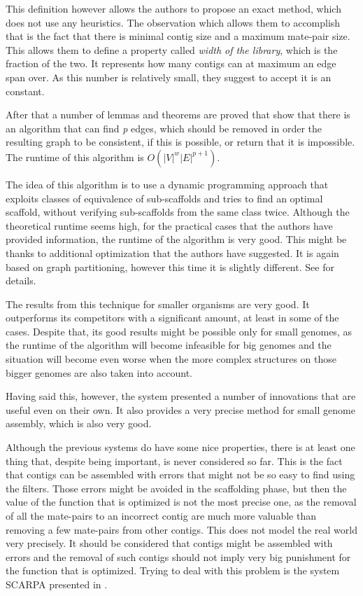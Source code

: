 \documentclass[11pt]{article}
\begin{document}
This definition however allows the authors to propose an exact method, which
does not use any heuristics. The observation which allows them to accomplish
that is the fact that there is minimal contig size and a maximum mate-pair size.
This allows them to define a property called \emph{width of the library}, which
is the fraction of the two. It represents how many contigs can at maximum an
edge span over. As this number is relatively small, they suggest to accept it is
an constant. 

After that a number of lemmas and theorems are proved that show that there is an
algorithm that can find \emph{p} edges, which should be removed in order the
resulting graph to be consistent, if this is possible, or return that it is
impossible. The runtime of this algorithm is $O(|V|^w |E|^{p + 1})$. 

The idea of this algorithm is to use a dynamic programming approach that
exploits classes of equivalence of sub-scaffolds and tries to find an optimal
scaffold, without verifying sub-scaffolds from the same class twice. Although
the theoretical runtime seems high, for the practical cases that the authors
have provided information, the runtime of the algorithm is very good. This might
be thanks to additional optimization that the authors have suggested. It is
again based on graph partitioning, however this time it is slightly different.
See \cite{Opera} for details.

The results from this technique for smaller organisms are very good. It
outperforms its competitors with a significant amount, at least in some of the
cases. Despite that, its good results might be possible only for small genomes,
as the runtime of the algorithm will become infeasible for big genomes and the
situation will become even worse when the more complex structures on those
bigger genomes are also taken into account. 

Having said this, however, the system presented a number of innovations that are
useful even on their own. It also provides a very precise method for small
genome assembly, which is also very good.

Although the previous systems do have some nice properties, there is at least
one thing that, despite being important, is never considered so far. This is the
fact that contigs can be assembled with errors that might not be so easy to find
using the filters. Those errors might be avoided in the scaffolding phase, but
then the value of the function that is optimized is not the most precise one, as
the removal of all the mate-pairs to an incorrect contig are much more valuable
than removing a few mate-pairs from other contigs. This does not model the real
world very precisely. It should be considered that contigs might be assembled
with errors and the removal of such contigs should not imply very big punishment
for the function that is optimized. Trying to deal with this problem is the
system SCARPA presented in \cite{SCARPA}.
\end{document}
